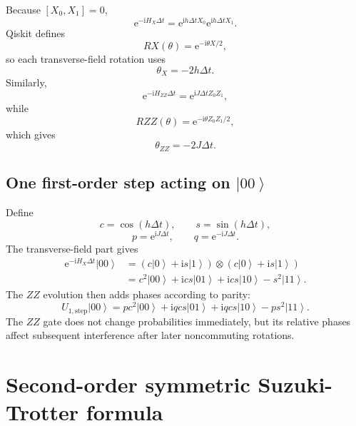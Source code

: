 \documentclass[11pt,a4paper]{article}
\newcommand{\ket}[1]{\left|#1\right\rangle}
\newcommand{\e}{\mathrm{e}}
\newcommand{\ii}{\mathrm{i}}
\begin{document}
Because $[X_0,X_1]=0$,
\begin{equation}
\e^{-\ii H_X\Delta t}
=\e^{\ii h\Delta t X_0}\e^{\ii h\Delta t X_1}.
\end{equation}
Qiskit defines
\begin{equation}
RX(\theta)=\e^{-\ii\theta X/2},
\end{equation}
so each transverse-field rotation uses
\begin{equation}
\boxed{\theta_X=-2h\Delta t.}
\end{equation}
Similarly,
\begin{equation}
\e^{-\ii H_{ZZ}\Delta t}=\e^{\ii J\Delta t Z_0Z_1},
\end{equation}
while
\begin{equation}
RZZ(\theta)=\e^{-\ii\theta Z_0Z_1/2},
\end{equation}
which gives
\begin{equation}
\boxed{\theta_{ZZ}=-2J\Delta t.}
\end{equation}

\subsection{One first-order step acting on \texorpdfstring{$\ket{00}$}{|00>}}

Define
\begin{equation}
c=\cos(h\Delta t),\qquad s=\sin(h\Delta t),
\end{equation}
\begin{equation}
p=\e^{\ii J\Delta t},\qquad q=\e^{-\ii J\Delta t}.
\end{equation}
The transverse-field part gives
\begin{align}
\e^{-\ii H_X\Delta t}\ket{00}
&=(c\ket{0}+\ii s\ket{1})\otimes(c\ket{0}+\ii s\ket{1})\\
&=c^2\ket{00}+\ii cs\ket{01}+\ii cs\ket{10}-s^2\ket{11}.
\end{align}
The $ZZ$ evolution then adds phases according to parity:
\begin{equation}
\boxed{
U_{1,\mathrm{step}}\ket{00}
=pc^2\ket{00}+\ii qcs\ket{01}+\ii qcs\ket{10}-ps^2\ket{11}.}
\label{eq:firststep}
\end{equation}
The $ZZ$ gate does not change probabilities immediately, but its relative phases affect subsequent interference after later noncommuting rotations.

\section{Second-order symmetric Suzuki-Trotter formula}
\end{document}
